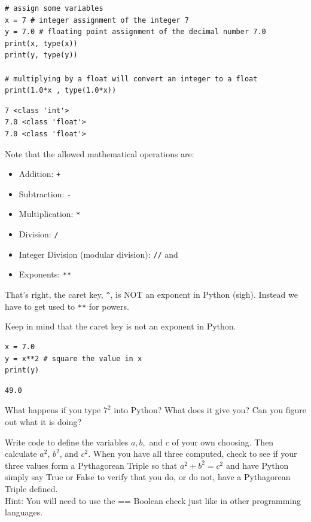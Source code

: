 \begin{example}

\bcode    
\begin{lstlisting}
# assign some variables
x = 7 # integer assignment of the integer 7
y = 7.0 # floating point assignment of the decimal number 7.0
print(x, type(x))
print(y, type(y))

# multiplying by a float will convert an integer to a float
print(1.0*x , type(1.0*x)) 
\end{lstlisting}
\boutput
\begin{lstlisting}
7 <class 'int'>
7.0 <class 'float'>
7.0 <class 'float'>
\end{lstlisting}
\end{example}


Note that the allowed mathematical operations are: 
\begin{itemize}
    \item Addition: \verb|+|
    \item Subtraction: \verb|-|
    \item Multiplication: \verb|*| 
    \item Division: \verb|/| 
    \item Integer Division (modular division): \verb|//| and
    \item Exponents: \verb|**|
\end{itemize}
That's right, the caret key, \verb|^|, is NOT an exponent in Python (sigh). Instead we
have to get used to \verb|**| for powers.

\begin{example}
    Keep in mind that the caret key is not an exponent in Python.  

\bcode    
\begin{lstlisting}
x = 7.0
y = x**2 # square the value in x
print(y)
\end{lstlisting}
\boutput
\begin{lstlisting}
49.0
\end{lstlisting}
\end{example}

\begin{problem}
    What happens if you type $7^2$ into Python?  What does it give you?  Can you figure
    out what it is doing?
\end{problem}

\begin{problem}
    Write code to define the variables  $a,b,$ and $c$  of your own choosing. Then
    calculate $a^2$, $b^2$, and $c^2$. When you have all three computed, check to see if
    your three values form a Pythagorean Triple so that $a^2 + b^2 = c^2$ and have Python
    simply say True or False to verify that you do, or do not, have a Pythagorean Triple
    defined.  \\
    Hint: You will need to use the == Boolean check just like in other
    programming languages.
\end{problem}



